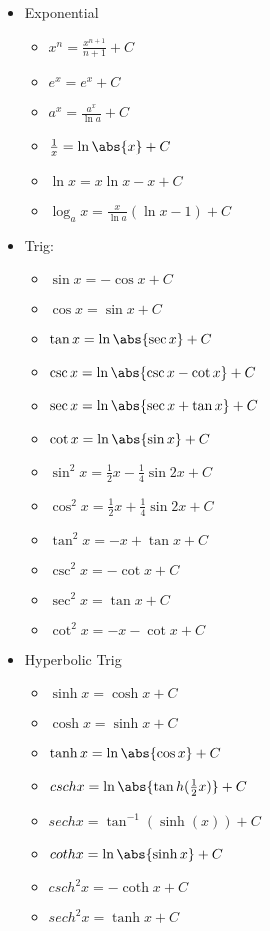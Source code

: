 \documentclass{report}
\begin{document}
     \begin{itemize}
      \item Exponential      
    \begin{itemize}
      \item $x^{n} = \frac{x^{n+1}}{n+1} + C$
      \item $e^{x} = e^{x} + C$
      \item $a^{x} = \frac{a^{x}}{\ln{a}} + C$
      \item $\frac{1}{x} = \ln{\abs{x}} + C$
      \item $\ln{x} = x\ln{x} - x + C$
      \item $\log_{a}{x} = \frac{x}{\ln{a}}(\ln{x} - 1) + C $
    \end{itemize}
    \bigbreak \noindent \bigbreak \noindent
  \item Trig:
    \begin{itemize}
      \item $\sin{x} = -\cos{x} +  C$
      \item $\cos{x} = \sin{x} + C$
      \item $\tan{x} = \ln{\abs{\sec{x}}} + C$
      \item $\csc{x} = \ln{\abs{\csc{x}-\cot{x}}} + C $
      \item $\sec{x}  = \ln{\abs{\sec{x}+\tan{x}}} + C$
      \item $\cot{x} = \ln{\abs{\sin{x}}} + C$
      \item $\sin^{2}{x} = \frac{1}{2}x-\frac{1}{4}\sin{2x} + C$
      \item $\cos^{2}{x}= \frac{1}{2}x+\frac{1}{4}\sin{2x} + C$
      \item $\tan^{2}{x}= -x + \tan{x} + C $
      \item $\csc^{2}{x}= -\cot{x} + C$
      \item $\sec^{2}{x} =\tan{x} + C$
      \item $\cot^{2}{x} =-x  - \cot{x} + C$
    \end{itemize}
    \bigbreak \noindent \bigbreak \noindent
  \item Hyperbolic Trig
    \begin{itemize}
      \item $\sinh{x} = \cosh{x} + C$
      \item $\cosh{x} = \sinh{x} + C$ 
      \item $\tanh{x} = \ln{\abs{\cos{x}}} + C$
      \item $csch{x} =  \ln{\abs{\tan{h}(\frac{1}{2}x)}} + C$ 
      \item $sech{x} = \tan^{-1}{(\sinh{(x)})} + C$
      \item $coth{x}= \ln{\abs{\sinh{x}}} + C $
      \item $csch^{2}{x} = -\coth{x}+ C$
      \item $sech^{2}{x} = \tanh{x} + C$
    \end{itemize}
    \end{itemize}
\end{document}

